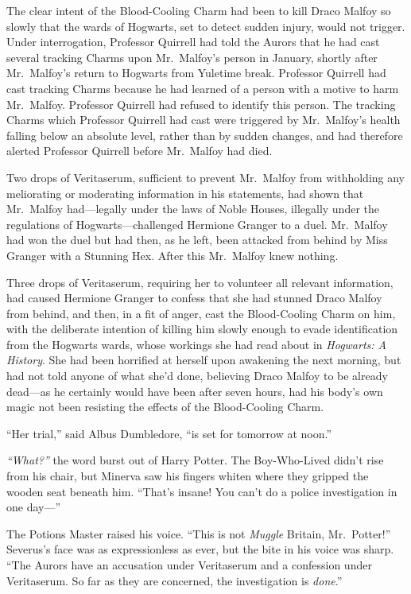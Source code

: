 The clear intent of the Blood-Cooling Charm had been to kill Draco
Malfoy so slowly that the wards of Hogwarts, set to detect sudden
injury, would not trigger. Under interrogation, Professor Quirrell had
told the Aurors that he had cast several tracking Charms upon
Mr.~Malfoy's person in January, shortly after Mr.~Malfoy's return to
Hogwarts from Yuletime break. Professor Quirrell had cast tracking
Charms because he had learned of a person with a motive to harm
Mr.~Malfoy. Professor Quirrell had refused to identify this person. The
tracking Charms which Professor Quirrell had cast were triggered by
Mr.~Malfoy's health falling below an absolute level, rather than by
sudden changes, and had therefore alerted Professor Quirrell before
Mr.~Malfoy had died.

Two drops of Veritaserum, sufficient to prevent Mr.~Malfoy from
withholding any meliorating or moderating information in his statements,
had shown that Mr.~Malfoy had---legally under the laws of Noble Houses,
illegally under the regulations of Hogwarts---challenged Hermione
Granger to a duel. Mr.~Malfoy had won the duel but had then, as he left,
been attacked from behind by Miss Granger with a Stunning Hex. After
this Mr.~Malfoy knew nothing.

Three drops of Veritaserum, requiring her to volunteer all relevant
information, had caused Hermione Granger to confess that she had stunned
Draco Malfoy from behind, and then, in a fit of anger, cast the
Blood-Cooling Charm on him, with the deliberate intention of killing him
slowly enough to evade identification from the Hogwarts wards, whose
workings she had read about in \emph{Hogwarts: A History}. She had been
horrified at herself upon awakening the next morning, but had not told
anyone of what she'd done, believing Draco Malfoy to be already
dead---as he certainly would have been after seven hours, had his body's
own magic not been resisting the effects of the Blood-Cooling Charm.

``Her trial,'' said Albus Dumbledore, ``is set for tomorrow at noon.''

\emph{``What?''} the word burst out of Harry Potter. The Boy-Who-Lived
didn't rise from his chair, but Minerva saw his fingers whiten where
they gripped the wooden seat beneath him. ``That's insane! You can't do
a police investigation in one day---''

The Potions Master raised his voice. ``This is not \emph{Muggle}
Britain, Mr.~Potter!'' Severus's face was as expressionless as ever, but
the bite in his voice was sharp. ``The Aurors have an accusation under
Veritaserum and a confession under Veritaserum. So far as they are
concerned, the investigation is \emph{done}.''

